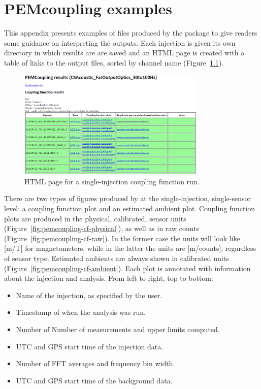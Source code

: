 \appendix

\renewcommand\thefigure{\thechapter.\arabic{figure}}
\renewcommand\thetable{\thechapter.\arabic{table}}
\setcounter{figure}{0}
\setcounter{table}{0}

\chapter{PEMcoupling examples}\label{app:pemcoupling}

This appendix presents examples of files produced by the \pemcoupling package to give readers some guidance on interpreting the outputs.
Each injection is given its own directory in which results are are saved and an HTML page is created with a table of links to the output files, sorted by channel name (Figure~\ref{fig:pemcoupling-html}).

\begin{figure}
  \centering
  \includegraphics[width=0.8\textwidth]{figures/appendix/pemcoupling-html.png}
  \caption{HTML page for a single-injection coupling function run.}
  \label{fig:pemcoupling-html}
\end{figure}

There are two types of figures produced by \pemcoupling at the single-injection, single-sensor level: a coupling function plot and an estimated ambient plot.
Coupling function plots are produced in the physical, calibrated, sensor units (Figure~\ref{fig:pemcoupling-cf-physical}), as well as in raw counts (Figure~\ref{fig:pemcoupling-cf-raw}).
In the former case the units will look like [m/T] for magnetometers, while in the latter the units are [m/counts], regardless of sensor type.
Estimated ambients are always shown in calibrated units (Figure~\ref{fig:pemcoupling-cf-ambient}).
Each plot is annotated with information about the injection and analysis.
From left to right, top to bottom:
\begin{itemize}
  \item Name of the injection, as specified by the user.
  \item Timestamp of when the analysis was run.
  \item Number of Number of measurements and upper limits computed.
  \item UTC and GPS start time of the injection data.
  \item Number of FFT averages and frequency bin width.
  \item UTC and GPS start time of the background data.
\end{itemize}

